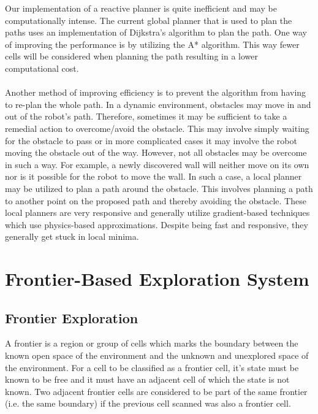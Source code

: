 \documentclass[a4paper,12pt]{article}
\begin{document}
			Our implementation of a reactive planner is quite inefficient and may be computationally intense. The current global planner that is used to plan the paths uses an implementation of Dijkstra's algorithm to plan the path. One way of improving the performance is by utilizing the A* algorithm. This way fewer cells will be considered when planning the path resulting in a lower computational cost.
			\\
			\\
			Another method of improving efficiency is to prevent the algorithm from having to re-plan the whole path. In a dynamic environment, obstacles may move in and out of the robot's path. Therefore, sometimes it may be sufficient to take a remedial action to overcome/avoid the obstacle. This may involve simply waiting for the obstacle to pass or in more complicated cases it may involve the robot moving the obstacle out of the way. However, not all obstacles may be overcome in such a way. For example, a newly discovered wall will neither move on its own nor is it possible for the robot to move the wall. In such a case, a local planner may be utilized to plan a path around the obstacle. This involves planning a path to another point on the proposed path and thereby avoiding the obstacle. These local planners are very responsive and generally utilize gradient-based techniques which use physics-based approximations. Despite being fast and responsive, they generally get stuck in local minima. 
			
	
	\section{Frontier-Based Exploration System}

		\subsection{Frontier Exploration}

			A frontier is a region or group of cells which marks the boundary between the known open space of the environment and the unknown and unexplored space of the environment. For a cell to be classified as a frontier cell, it's state must be known to be free and it must have an adjacent cell of which the state is not known. Two adjacent frontier cells are considered to be part of the same frontier (i.e. the same boundary) if the previous cell scanned was also a frontier cell.\cite{keidar2011fast}
			
\end{document}
